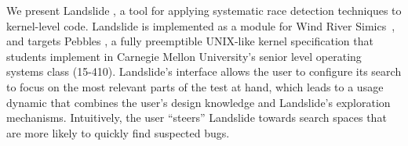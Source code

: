 \documentclass{llncs}
\begin{document}
We present Landslide \cite{landslide},
a tool for applying systematic race detection techniques to kernel-level code.
Landslide is implemented as a module for Wind River Simics\textsuperscript{\texttrademark}~\cite{simics}, and targets Pebbles \cite{kspec}, a fully preemptible UNIX-like kernel specification that students implement in Carnegie Mellon University's senior level operating systems class (15-410).
Landslide's interface allows the user to configure its search to focus on the most relevant parts of the test at hand, which leads to a usage dynamic that combines the user's design knowledge and Landslide's exploration mechanisms. Intuitively, the user ``steers'' Landslide towards search spaces that are more likely to quickly find suspected bugs.

\end{document}
